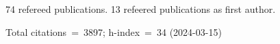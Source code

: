 74 refereed publications. 13 refeered publications as first author.

Total citations~=~3897; h-index~=~34 (2024-03-15)